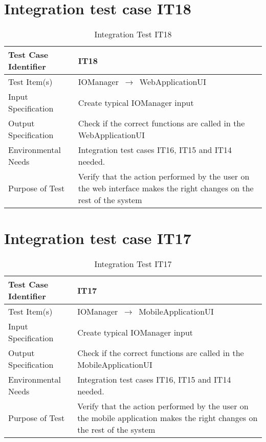 \documentclass[../../testPlan.tex]{subfiles}
\begin{document}
		
	\section{Integration test case IT18}
		\begin{table}[H]
			\centering
			\label{IT18}
			\begin{tabular}{ll}
				\hline
				Test Case Identifier & IT18 \\ \hline
				Test Item(s)         & IOManager $\,\to\,$ WebApplicationUI\\ \hline
				Input Specification  & Create typical IOManager input  \\ \hline
				Output Specification & Check if the correct functions are called in the WebApplicationUI\\ \hline
				Environmental Needs  &  Integration test cases IT16, IT15 and IT14 needed. \\ \hline
				Purpose of Test      &  Verify that the action performed by the user on the web interface makes the right changes on the rest of the system  \\ \hline
			\end{tabular}
			\caption{Integration Test IT18}
		\end{table}
		
		
	\section{Integration test case IT17}
		\begin{table}[H]
			\centering
			\label{IT17}
			\begin{tabular}{ll}
				\hline
				Test Case Identifier & IT17 \\ \hline
				Test Item(s)         & IOManager $\,\to\,$ MobileApplicationUI\\ \hline
				Input Specification  & Create typical IOManager input  \\ \hline
				Output Specification & Check if the correct functions are called in the MobileApplicationUI\\ \hline
				Environmental Needs  &  Integration test cases IT16, IT15 and IT14 needed. \\ \hline
				Purpose of Test      &  Verify that the action performed by the user on the mobile application makes the right changes on the rest of the system  \\ \hline
			\end{tabular}
			\caption{Integration Test IT17}
		\end{table}
		
		
	
\end{document}
